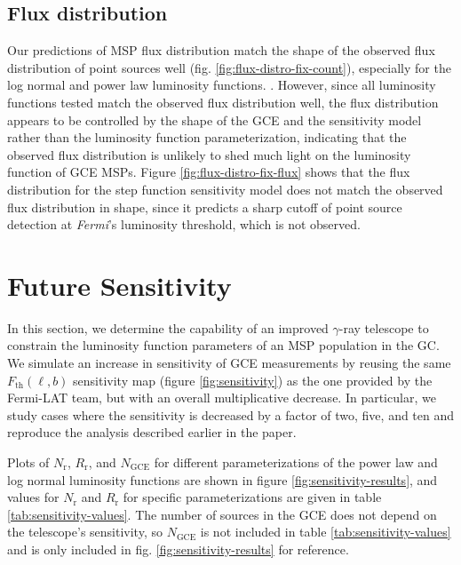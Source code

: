 \documentclass[a4paper,11pt]{article}
\newcommand{\comment}[1]{\emph{\color{red}{#1}}}
\begin{document}
\subsection{Flux distribution}
Our predictions of MSP flux distribution match the shape of the observed flux distribution of point sources well (fig. \ref{fig:flux-distro-fix-count}), especially for the log normal and power law luminosity functions. \comment{Should I make some Poissonian error bars and find a p value?}. However, since all luminosity functions tested match the observed flux distribution well, the flux distribution appears to be controlled by the shape of the GCE and the sensitivity model rather than the luminosity function parameterization, indicating that the observed flux distribution is unlikely to shed much light on the luminosity function of GCE MSPs. \comment{Is that too unsubstantiated to say?} Figure \ref{fig:flux-distro-fix-flux} shows that the flux distribution for the step function sensitivity model does not match the observed flux distribution in shape, since it predicts a sharp cutoff of point source detection at \textit{Fermi}'s luminosity threshold, which is not observed.





\section{Future Sensitivity}
In this section, we determine the capability of an improved $\gamma$-ray telescope to constrain the luminosity function parameters of an MSP population in the GC. We simulate an increase in sensitivity of GCE measurements by reusing the same $F_\text{th}(\ell, b)$ sensitivity map (figure \ref{fig:sensitivity}) as the one provided by the Fermi-LAT team, but with an overall multiplicative decrease. In particular, we study cases where the sensitivity is decreased by a factor of two, five, and ten and reproduce the analysis described earlier in the paper.

Plots of $N_\text{r}$, $R_\text{r}$, and $N_\text{GCE}$ for different parameterizations of the power law and log normal luminosity functions are shown in figure \ref{fig:sensitivity-results}, and values for $N_\text{r}$ and $R_\text{r}$ for specific parameterizations are given in table \ref{tab:sensitivity-values}. The number of sources in the GCE does not depend on the telescope's sensitivity, so $N_\text{GCE}$ is not included in table \ref{tab:sensitivity-values} and is only included in fig. \ref{fig:sensitivity-results} for reference. \comment{That means that the backgrounds of the column plots do not change from plot to plot. I could put them all on the same thing.}
\end{document}
